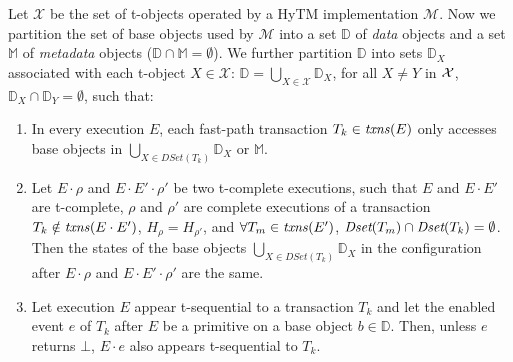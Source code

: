 \begin{definition} 
\label{def:metadata}
Let $\mathcal{X}$ be the set of t-objects operated by a HyTM implementation $\mathcal{M}$. 
Now we partition the set of base objects used by $\mathcal{M}$ into a set $\mathbb{D}$ of \emph{data} objects and 
a set $\mathbb{M}$ of \emph{metadata} objects ($\mathbb{D}\cap \mathbb{M} = \emptyset$). We further partition
$\mathbb{D}$ into sets $\mathbb{D}_X$ associated with each t-object $X
\in \mathcal{X}$:  $\mathbb{D} = \bigcup\limits_{X\in\mathcal{X}} \mathbb{D}_X$,
for all $X\neq Y$ in $\mathcal{X}$, $\mathbb{D}_X \cap \mathbb{D}_Y =
\emptyset$,
such that:
%
\begin{enumerate}
\item In every execution $E$, each fast-path transaction $T_k \in \ms{txns}(E)$ only 
accesses base objects in $\bigcup\limits_{X\in DSet(T_k)}
\mathbb{D}_X$ or $\mathbb{M}$.
\item
Let $E\cdot\rho$ and $E\cdot E'\cdot\rho'$ be two t-complete
executions, such that $E$ and $E\cdot E'$ are t-complete, 
$\rho$ and $\rho'$ are complete executions of a transaction
$T_k\notin\ms{txns}(E\cdot E')$, $H_{\rho}=H_{\rho'}$, and $\forall
T_m\in \ms{txns}(E')$, $\textit{Dset}(T_m)\cap \textit{Dset}(T_k)=\emptyset$. 
Then the states of the base objects $\bigcup\limits_{X\in DSet(T_k)} \mathbb{D}_X$ 
in the configuration after $E\cdot \rho$ and $E\cdot E' \cdot {\rho'}$
are the same.    


\item 
Let execution $E$ appear t-sequential to a transaction $T_k$ and let
the enabled event $e$ of $T_k$ after $E$ be a primitive on a base
object $b\in \mathbb{D}$. Then, unless $e$ returns $\bot$, $E\cdot e$
also appears t-sequential to $T_k$. 
 

\end{enumerate}
\end{definition}
